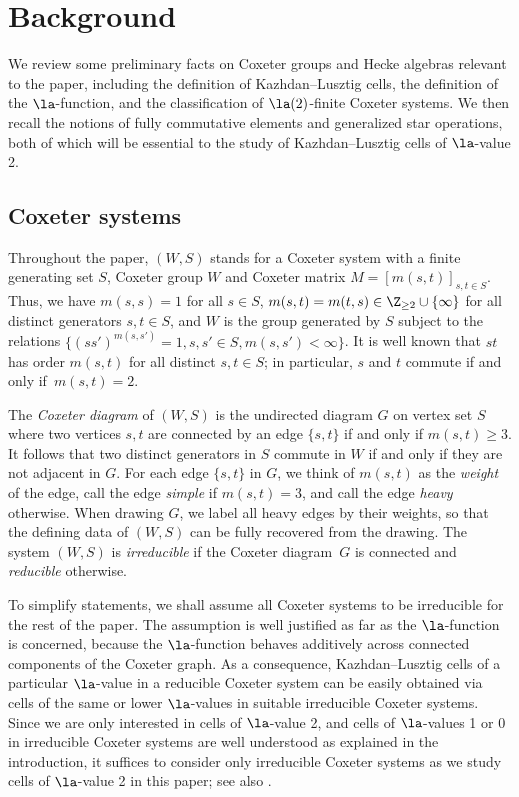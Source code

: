 \section{Background}
\label{sec:preliminaries}

We review some preliminary facts on Coxeter groups and Hecke algebras relevant to the paper,
including the definition of Kazhdan--Lusztig cells, the definition of the $\la$-function, and the
classification of $\la(2)$-finite Coxeter systems. We then recall the notions of fully commutative
elements and generalized star operations, both of which will be essential to the study of
Kazhdan--Lusztig cells of $\la$-value 2.  

\subsection{Coxeter systems}
\label{sec:CoxeterSystems}
Throughout the paper, $(W,S)$ stands for a Coxeter system with a finite generating set $S$, Coxeter
group $W$ and Coxeter matrix $M=[m(s,t)]_{s,t\in S}$. Thus, we have $m(s,s)=1$ for all $s\in S$,
$m(s,t)=m(t,s)\in \Z_{\ge 2}\cup\{\infty\}$ for all distinct generators $s,t\in S$, and $W$ is the
group generated by $S$ subject to the relations $\{(ss')^{m(s,s')}=1, s,s'\in S, m(s,s')<\infty\}$.
It is well known that $st$ has order $m(s,t)$ for all distinct $s,t\in S$; in particular, $s$ and
$t$ commute if and only if~$m(s,t)=2$. 

The \emph{Coxeter diagram} of $(W,S)$ is the undirected diagram $G$ on vertex set $S$ where two
vertices $s,t$ are connected by an edge $\{s,t\}$ if and only if $m(s,t)\ge 3$. It follows that two
distinct generators in $S$ commute in $W$ if and only if they are not adjacent in $G$. For each edge
$\{s,t\}$ in $G$, we think of $m(s,t)$ as the \emph{weight} of the edge, call the edge \emph{simple}
if $m(s,t)=3$, and call the edge \emph{heavy} otherwise.  When drawing $G$, we label all heavy edges
by their weights, so that the defining data of $(W,S)$ can be fully recovered from the drawing.  The
system $(W,S)$ is \emph{irreducible} if the Coxeter diagram~$G$ is connected and \emph{reducible}
otherwise. 

\begin{remark}
\label{rmk:irreducible}
To simplify statements, we shall assume all Coxeter systems to be irreducible for the rest of the
paper.  The assumption is well justified as far as the $\la$-function is concerned, because the
$\la$-function behaves additively across connected components of the Coxeter graph. As a
consequence, Kazhdan--Lusztig cells of a particular $\la$-value in a reducible Coxeter system can be
easily obtained via cells of the same or lower $\la$-values in suitable irreducible Coxeter systems.
Since we are only interested in cells of $\la$-value 2, and cells of $\la$-values 1 or 0 in
irreducible Coxeter systems are well understood as explained in the introduction, it suffices to
consider only irreducible Coxeter systems as we study cells of $\la$-value 2 in this paper; see also
\cite[Theorem 1.3]{GreenXu}.
\end{remark}

